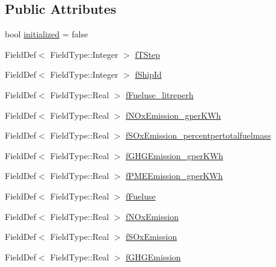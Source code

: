 \subsection*{Public Attributes}
\begin{DoxyCompactItemize}
\item 
bool \mbox{\hyperlink{struct_ships_table_1_1_impl_ac4b851dd5fbef49f9d321677e34fdb07}{initialized}} = false
\item 
Field\+Def$<$ Field\+Type\+::\+Integer $>$ \mbox{\hyperlink{struct_ships_table_1_1_impl_a5349975645b3eb74fe50510c44cc7ffb}{f\+T\+Step}}
\item 
Field\+Def$<$ Field\+Type\+::\+Integer $>$ \mbox{\hyperlink{struct_ships_table_1_1_impl_a50136df8b124ebd45e97142ee1e0e19e}{f\+Ship\+Id}}
\item 
Field\+Def$<$ Field\+Type\+::\+Real $>$ \mbox{\hyperlink{struct_ships_table_1_1_impl_a74262a4b0a8c274d4c6d2b865f166a4f}{f\+Fueluse\+\_\+litreperh}}
\item 
Field\+Def$<$ Field\+Type\+::\+Real $>$ \mbox{\hyperlink{struct_ships_table_1_1_impl_ac0c35c7a9d264fc3269376e25c173718}{f\+N\+Ox\+Emission\+\_\+gper\+K\+Wh}}
\item 
Field\+Def$<$ Field\+Type\+::\+Real $>$ \mbox{\hyperlink{struct_ships_table_1_1_impl_afb5a137533b442216a6ee10fb6d0c5f7}{f\+S\+Ox\+Emission\+\_\+percentpertotalfuelmass}}
\item 
Field\+Def$<$ Field\+Type\+::\+Real $>$ \mbox{\hyperlink{struct_ships_table_1_1_impl_a1ab1d9871411b949d1c0aa2094def1ad}{f\+G\+H\+G\+Emission\+\_\+gper\+K\+Wh}}
\item 
Field\+Def$<$ Field\+Type\+::\+Real $>$ \mbox{\hyperlink{struct_ships_table_1_1_impl_a6ca431ea16c9cc70afb8a37e844fd7d3}{f\+P\+M\+E\+Emission\+\_\+gper\+K\+Wh}}
\item 
Field\+Def$<$ Field\+Type\+::\+Real $>$ \mbox{\hyperlink{struct_ships_table_1_1_impl_a92d2ff078567c54fd9caaea72b3a2b66}{f\+Fueluse}}
\item 
Field\+Def$<$ Field\+Type\+::\+Real $>$ \mbox{\hyperlink{struct_ships_table_1_1_impl_a0cf4f3a3fef002e3fcf44cad3652ed39}{f\+N\+Ox\+Emission}}
\item 
Field\+Def$<$ Field\+Type\+::\+Real $>$ \mbox{\hyperlink{struct_ships_table_1_1_impl_a81b4ad6a2480a51ac1fe59072ea48f08}{f\+S\+Ox\+Emission}}
\item 
Field\+Def$<$ Field\+Type\+::\+Real $>$ \mbox{\hyperlink{struct_ships_table_1_1_impl_ab0f4e9ae1ef2729926f1f9f2130e31f3}{f\+G\+H\+G\+Emission}}
\item 

\end{DoxyCompactItemize}
